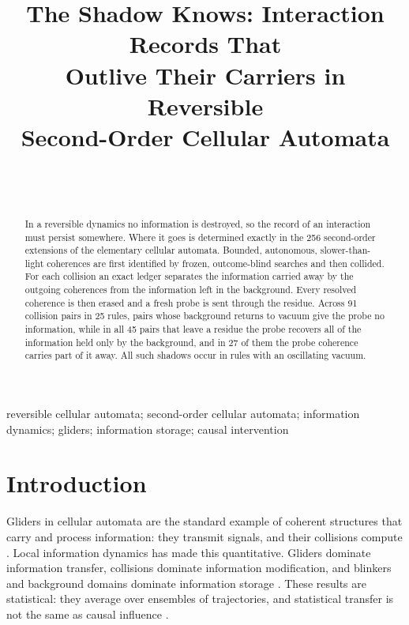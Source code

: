 \documentclass{article}
\newcommand{\nsthreePairs}{91}
\newcommand{\nsthreeShadow}{45}
\newcommand{\nsthreeStatePos}{27}
\begin{document}
\title{The Shadow Knows: Interaction Records That\\ Outlive Their Carriers in Reversible\\ Second-Order Cellular Automata}
\author{\\[2pt]
\\
}
\maketitle
\begin{abstract}
In a reversible dynamics no information is destroyed, so the record of an interaction must persist somewhere. Where it goes is determined exactly in the 256 second-order extensions of the elementary cellular automata. Bounded, autonomous, slower-than-light coherences are first identified by frozen, outcome-blind searches and then collided. For each collision an exact ledger separates the information carried away by the outgoing coherences from the information left in the background. Every resolved coherence is then erased and a fresh probe is sent through the residue. Across \nsthreePairs{} collision pairs in 25 rules, pairs whose background returns to vacuum give the probe no information, while in all \nsthreeShadow{} pairs that leave a residue the probe recovers all of the information held only by the background, and in \nsthreeStatePos{} of them the probe coherence carries part of it away. All such shadows occur in rules with an oscillating vacuum.
\end{abstract}
\begin{keywords}
reversible cellular automata; second-order cellular automata; information dynamics; gliders; information storage; causal intervention
\end{keywords}
\section{Introduction}
Gliders in cellular automata are the standard example of coherent structures that carry and
process information: they transmit signals, and their collisions compute
\cite{park1986,boccara1991,hanson1997,adamatzky2012}. Local information dynamics has made this
quantitative. Gliders dominate information transfer, collisions dominate information modification,
and blinkers and background domains dominate information storage
\cite{lizier2008,lizier2010mod,lizier2012}. These results are statistical: they average over
ensembles of trajectories, and statistical transfer is not the same as causal influence
\cite{lizier2010caus,james2016}.
\end{document}
